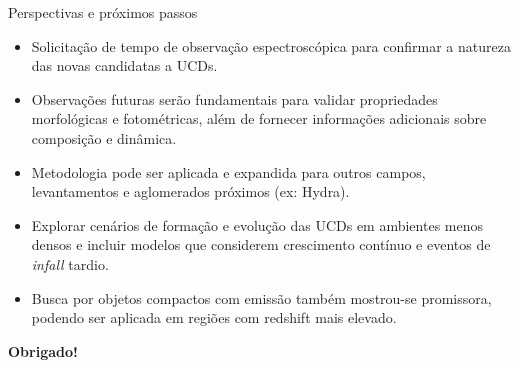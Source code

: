 \begin{frame}[c]{Perspectivas e próximos passos}
    \begin{itemize}
        \item Solicitação de tempo de observação espectroscópica para confirmar a natureza das novas candidatas a UCDs.
        \item Observações futuras serão fundamentais para validar propriedades morfológicas e fotométricas, além de fornecer informações adicionais sobre composição e dinâmica.
        \item Metodologia pode ser aplicada e expandida para outros campos, levantamentos e aglomerados próximos (ex: Hydra).
        \item Explorar cenários de formação e evolução das UCDs em ambientes menos densos e incluir modelos que considerem crescimento contínuo e eventos de \textit{infall} tardio.
        \item Busca por objetos compactos com emissão também mostrou-se promissora, podendo ser aplicada em regiões com redshift mais elevado.
    \end{itemize}
\end{frame}

\begin{frame}[c]
    \centering
    \vspace{2cm}
    {\LARGE \textbf{Obrigado!}}
\end{frame}



